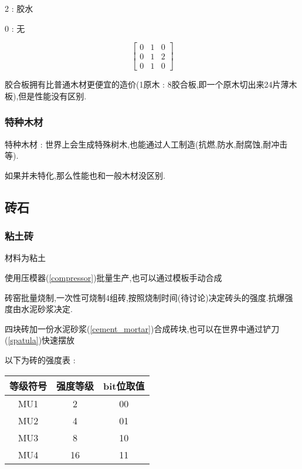 {{{\begin{center}
              2 : 胶水

              0 : 无

              $$
                  \begin{bmatrix}
                      0 & 1 & 0 \\
                      0 & 1 & 2 \\
                      0 & 1 & 0
                  \end{bmatrix}
              $$
          \end{center}

          胶合板拥有比普通木材更便宜的造价(1原木 : 8胶合板,即一个原木切出来24片薄木板),但是性能没有区别.
      }

      \subsubsection{特种木材}{
          特种木材 : 世界上会生成特殊树木,也能通过人工制造(抗燃,防水,耐腐蚀,耐冲击等).

          如果并未特化,那么性能也和一般木材没区别.
      }
  }

  \subsection{砖石}{

      \subsubsection{粘土砖}{
          材料为粘土

          使用压模器({\ref{compressor}})批量生产,也可以通过模板手动合成

          砖窑批量烧制,一次性可烧制4组砖,按照烧制时间(待讨论)决定砖头的强度.抗爆强度由水泥砂浆决定.

          四块砖加一份水泥砂浆({\ref{cement_mortar}})合成砖块,也可以在世界中通过铲刀({\ref{spatula}})快速摆放

          以下为砖的强度表 :

          \begin{center}
              \begin{tabular}{|c|c|c|}
                  \hline
                  等级符号 & 强度等级 & bit位取值 \\
                  \hline
                  MU1      & 2        & 00        \\
                  \hline
                  MU2      & 4        & 01        \\
                  \hline
                  MU3      & 8        & 10        \\
                  \hline
                  MU4      & 16       & 11        \\
                  \hline
              \end{tabular}
          \end{center}
      }

}}
